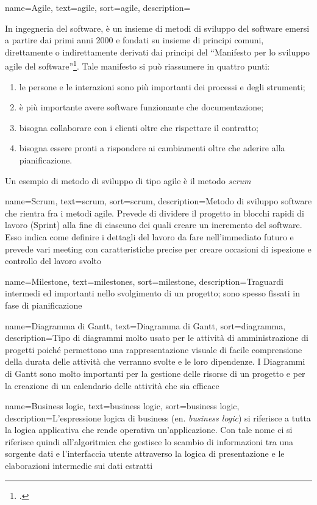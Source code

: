 {
    name=Agile,
    text=agile,
    sort=agile,
    description={In ingegneria del software, è un insieme di metodi di sviluppo del software emersi a partire dai primi anni 2000 e fondati su insieme di principi comuni, direttamente o indirettamente derivati dai principi del ``Manifesto per lo sviluppo agile del software''\footcite{manifesto}. Tale manifesto si può riassumere in quattro punti:
        \begin{enumerate}
            \item le persone e le interazioni sono più importanti dei processi e degli strumenti;
            \item è più importante avere software funzionante che documentazione;
            \item bisogna collaborare con i clienti oltre che rispettare il contratto;
            \item bisogna essere pronti a rispondere ai cambiamenti oltre che aderire alla pianificazione.
        \end{enumerate}
    Un esempio di metodo di sviluppo di tipo agile è il metodo \emph{\gls{scrum}}\glsfirstoccur}
}

{
    name=Scrum,
    text=scrum,
    sort=scrum,
    description={Metodo di sviluppo software che rientra fra i metodi agile. Prevede di dividere il progetto in blocchi rapidi di lavoro (Sprint) alla fine di ciascuno dei quali creare un incremento del software. Esso indica come definire i dettagli del lavoro da fare nell'immediato futuro e prevede vari meeting con caratteristiche precise per creare occasioni di ispezione e controllo del lavoro svolto}
}

{
    name=Milestone,
    text=milestones,
    sort=milestone,
    description={Traguardi intermedi ed importanti nello svolgimento di un progetto; sono spesso fissati in fase di pianificazione}
}

{
    name=Diagramma di Gantt,
    text=Diagramma di Gantt,
    sort=diagramma,
    description={Tipo di diagrammi molto usato per le attività di amministrazione di progetti poiché
        permettono una rappresentazione visuale di facile comprensione della durata delle attività
        che verranno svolte e le loro dipendenze. I Diagrammi di Gantt sono molto importanti
        per la gestione delle risorse di un progetto e per la creazione di un calendario delle attività
        che sia efficace}
}

{
    name=Business logic,
    text=business logic,
    sort=business logic,
    description={L'espressione logica di business (en. \textit{business logic}) si riferisce a tutta la logica applicativa che rende operativa un'applicazione. Con tale nome ci si riferisce quindi all'algoritmica che gestisce lo scambio di informazioni tra una sorgente dati e l'interfaccia utente attraverso la logica di presentazione e le elaborazioni intermedie sui dati estratti
}}

